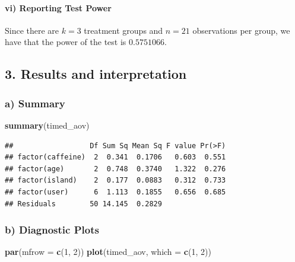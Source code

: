 \documentclass[
]{article}
\newenvironment{Shaded}{\begin{snugshade}}{\end{snugshade}}
\newcommand{\AttributeTok}[1]{\textcolor[rgb]{0.13,0.29,0.53}{#1}}
\newcommand{\DecValTok}[1]{\textcolor[rgb]{0.00,0.00,0.81}{#1}}
\newcommand{\FunctionTok}[1]{\textcolor[rgb]{0.13,0.29,0.53}{\textbf{#1}}}
\newcommand{\NormalTok}[1]{#1}
\begin{document}
\paragraph{vi) Reporting Test Power}\label{vi-reporting-test-power}

Since there are \(k=3\) treatment groups and \(n=21\) observations per
group, we have that the power of the test is \(0.5751066\).

\subsection{3. Results and
interpretation}\label{results-and-interpretation}

\subsubsection{a) Summary}\label{a-summary}

\begin{Shaded}
\begin{Highlighting}[]
\FunctionTok{summary}\NormalTok{(timed\_aov)}
\end{Highlighting}
\end{Shaded}

\begin{verbatim}
##                  Df Sum Sq Mean Sq F value Pr(>F)
## factor(caffeine)  2  0.341  0.1706   0.603  0.551
## factor(age)       2  0.748  0.3740   1.322  0.276
## factor(island)    2  0.177  0.0883   0.312  0.733
## factor(user)      6  1.113  0.1855   0.656  0.685
## Residuals        50 14.145  0.2829
\end{verbatim}

\subsubsection{b) Diagnostic Plots}\label{b-diagnostic-plots}

\begin{Shaded}
\begin{Highlighting}[]
\FunctionTok{par}\NormalTok{(}\AttributeTok{mfrow =} \FunctionTok{c}\NormalTok{(}\DecValTok{1}\NormalTok{, }\DecValTok{2}\NormalTok{))}
\FunctionTok{plot}\NormalTok{(timed\_aov, }\AttributeTok{which =} \FunctionTok{c}\NormalTok{(}\DecValTok{1}\NormalTok{, }\DecValTok{2}\NormalTok{))}
\end{Highlighting}
\end{Shaded}
\end{document}
